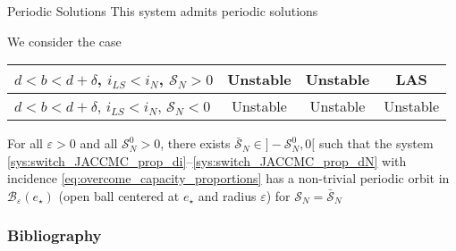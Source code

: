 \documentclass[aspectratio=169]{beamer}\usepackage[]{graphicx}\usepackage[]{xcolor}
\begin{document}
\begin{frame}{Periodic Solutions}
\bbullet This system admits periodic solutions

\bbullet We consider the case
\begin{center}
\begin{tabular}{|l|c|c|c|}
\hline
$d<b<d+\delta$, $i_{LS}<i_N$, $\mathcal{S}_N>0$ & Unstable & Unstable & LAS \\
\hline
$d<b<d+\delta$, $i_{LS}<i_N$, $\mathcal{S}_N<0$ & Unstable & Unstable & Unstable \\
\hline
\end{tabular}
\end{center}

\begin{theorem}
For all $\varepsilon>0$ and all $\mathcal{S}_N^0>0$, there exists $\bar{\mathcal{S}}_N\in ]-\mathcal{S}_N^0,0[$ such that the system \eqref{sys:switch_JACCMC_prop_di}--\eqref{sys:switch_JACCMC_prop_dN} with incidence \eqref{eq:overcome_capacity_proportions} has a non-trivial periodic orbit in $\mathcal{B}_\varepsilon(e_{\star})$ (open ball centered at $e_{\star}$ and radius $\varepsilon$) for $\mathcal{S}_N=\bar{\mathcal{S}}_N$
\end{theorem}
\end{frame}


\begin{frame}[allowframebreaks]
\frametitle{Bibliography}


\end{frame}
\end{document}
